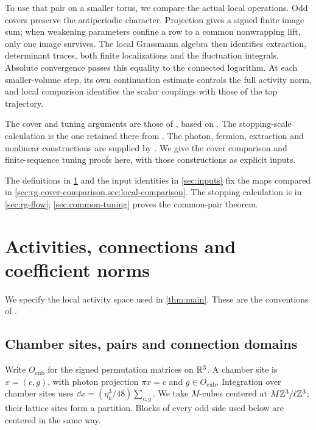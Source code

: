To use that pair on a smaller torus, we compare the actual local
operations. Odd covers preserve the antiperiodic character. Projection
gives a signed finite image sum; when weakening parameters confine a
row to a common nonwrapping lift, only one image survives. The local
Grassmann algebra then identifies extraction, determinant traces, both
finite localizations and the fluctuation integrals. Absolute convergence
passes this equality to the connected logarithm. At each smaller-volume
step, its own continuation estimate controls the full activity norm,
and local comparison identifies the scalar couplings with those of the
top trajectory.

The cover and tuning arguments are those of
\cite[\S\S15--16]{QED3Master}, based on
\cite[Chapters~27--28]{ChamberRG}. The stopping-scale calculation is
the one retained there from \cite[Chapter~19]{LatticeCurvature}.
The photon, fermion, extraction and nonlinear constructions are supplied
by \cite{MaxwellBlockManuscript,FermionBlockManuscript,NormalizedContraction,NonlinearStep}.
We give the cover comparison and finite-sequence tuning proofs here,
with those constructions as explicit inputs.

The definitions in \cref{sec:activities} and the input identities in
\cref{sec:inputs} fix the maps compared in
\cref{sec:rg-cover-comparison,sec:local-comparison}.
The stopping calculation is in \cref{sec:rg-flow};
\cref{sec:common-tuning} proves the common-pair theorem.
\section{Activities, connections and coefficient norms}
\label{sec:activities}

We specify the local activity space used in \cref{thm:main}.
These are the conventions of \cite[\S2]{NormalizedContraction}.

\subsection{Chamber sites, pairs and connection domains}

Write \(O_{\mathrm{cub}}\) for the signed permutation matrices on
\(\mathbb R^3\). A chamber site is \(x=(c,g)\), with photon projection
\(\pi x=c\) and \(g\in O_{\mathrm{cub}}\). Integration over chamber
sites uses \(\dd x=(\eta_k^3/48)\sum_{c,g}\). We take
\(M\)-cubes centered at \(M\mathbb Z^3/\ell\mathbb Z^3\); their lattice sites
form a partition. Blocks of every odd side used below are centered
in the same way.

